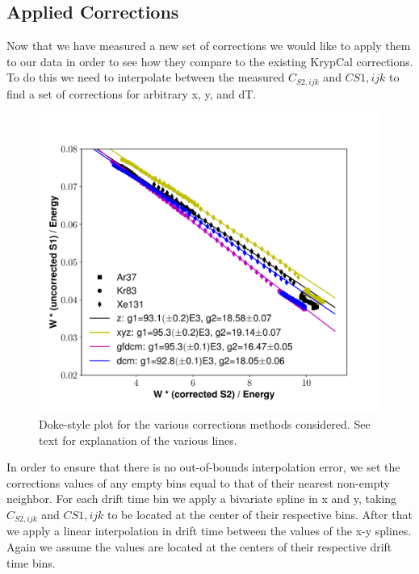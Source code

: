 \subsection{Applied Corrections}
Now that we have measured a new set of corrections we would like to apply them to our data in order to see how they compare to the existing KrypCal corrections. To do this we need to interpolate between the measured $C_{S2,ijk}$ and $C{S1,ijk}$ to find a set of corrections for arbitrary x, y, and dT.
\begin{figure}[h!]
\centering
\includegraphics[width=150mm]{Figures/dt_doke_plot.pdf}
\caption{Doke-style plot for the various corrections methods considered. See text for explanation of the various lines.}
\label{fig:dt_doke_plot} 
\end{figure}

In order to ensure that there is no out-of-bounds interpolation error, we set the corrections values of any empty bins equal to that of their nearest non-empty neighbor. For each drift time bin we apply a bivariate spline in x and y, taking $C_{S2,ijk}$ and $C{S1,ijk}$ to be located at the center of their respective bins. After that we apply a linear interpolation in drift time between the values of the x-y splines. Again we assume the values are located at the centers of their respective drift time bins.

